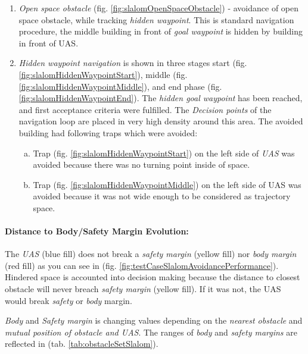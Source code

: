 \begin{enumerate}
    \item \emph{Open space obstacle} (fig. \ref{fig:slalomOpenSpaceObstacle}) - avoidance of open space obstacle, while tracking \emph{hidden waypoint}. This is standard navigation procedure, the middle building in front of \emph{goal waypoint} is hidden by building in front of UAS.
        
    \item \emph{Hidden waypoint navigation} is shown in three stages start (fig. \ref{fig:slalomHiddenWaypointStart}), middle (fig. \ref{fig:slalomHiddenWaypointMiddle}), and end phase (fig. \ref{fig:slalomHiddenWaypointEnd}). The \emph{hidden goal waypoint} has been reached, and first acceptance criteria were fulfilled.  The \emph{Decision points} of the navigation loop are placed in very high density around this area. The avoided building had following traps which were avoided:
    
    \begin{enumerate}[a.]
        \item Trap (fig. \ref{fig:slalomHiddenWaypointStart}) on the left side of \emph{UAS} was avoided because there was no turning point inside of space.
    
        \item Trap (fig. \ref{fig:slalomHiddenWaypointMiddle}) on the left side of UAS was avoided because it was not wide enough to be considered as trajectory space.
    \end{enumerate}
\end{enumerate}

\paragraph{Distance to Body/Safety Margin Evolution:} The \emph{UAS} (blue fill) does not break a \emph{safety margin} (yellow fill) nor \emph{body margin} (red fill) as you can see in (fig. \ref{fig:testCaseSlalomAvoidancePerformance}). Hindered space is accounted into decision making because the distance to closest obstacle will never breach \emph{safety margin} (yellow fill). If it was not, the UAS would break \emph{safety} or \emph{body} margin. 

\emph{Body} and \emph{Safety margin} is changing values depending on the \emph{nearest obstacle} and \emph{mutual position of obstacle and UAS}. The ranges of \emph{body} and \emph{safety margins} are reflected in (tab. \ref{tab:obstacleSetSlalom}). 

